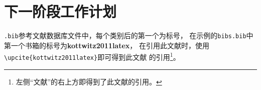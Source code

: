 \chapter{下一阶段工作计划}
\label{chapter-basic}

\texttt{.bib}参考文献数据库文件中，每个类别后的第一个为标号，
在示例的\texttt{bibs.bib}中第一个书箱的标号为\textbf{kottwitz2011latex}，
在引用此文献时，使用\verb|\upcite{kottwitz2011latex}|即可得到此文献
的引用\footnote{左侧“文献”的右上方即得到了此文献的引用。}。



